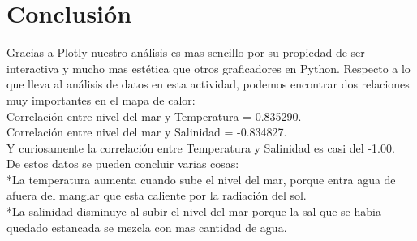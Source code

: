 \documentclass{article}
\begin{document}
\section{Conclusión}
Gracias a Plotly nuestro análisis es mas sencillo por su propiedad de ser interactiva y mucho mas estética que otros graficadores en Python. Respecto a lo que lleva al análisis de datos en esta actividad, podemos encontrar dos relaciones muy importantes en el mapa de calor:\\
Correlación entre nivel del mar y Temperatura = 0.835290.\\
Correlación entre nivel del mar y Salinidad = -0.834827.\\
Y curiosamente la correlación entre Temperatura y Salinidad es casi del -1.00.\\
De estos datos se pueden concluir varias cosas:\\
*La temperatura aumenta cuando sube el nivel del mar, porque entra agua de afuera del manglar que esta caliente por la radiación del sol.\\
*La salinidad disminuye al subir el nivel del mar porque la sal que se habia quedado estancada se mezcla con mas cantidad de agua.
\end{document}
